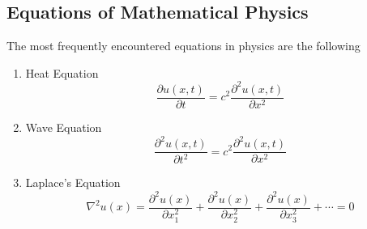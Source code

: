 \documentclass[]{article}
\begin{document}
\subsection{Equations of Mathematical Physics}
The most frequently encountered equations in physics are the following
\begin{enumerate}
\item Heat Equation
\[
    \frac{\partial u(x,t)}{\partial t} = c^2 \frac{\partial^2 u(x,t)}{\partial x^2}    
\]
\item Wave Equation 
\[
    \frac{\partial^2 u(x,t)}{\partial t^2} = c^2 \frac{\partial^2 u(x,t)}{\partial x^2}    
\]
\item Laplace's Equation
\[
    \nabla^2 u(x) = \frac{\partial^2 u(x)}{\partial x^{2}_{1}} + \frac{\partial^2 u(x)}{\partial x^{2}_{2}} + \frac{\partial^2 u(x)}{\partial x^{2}_{3}} + \cdots = 0    
\]
\end{enumerate}

\newpage
\end{document}
